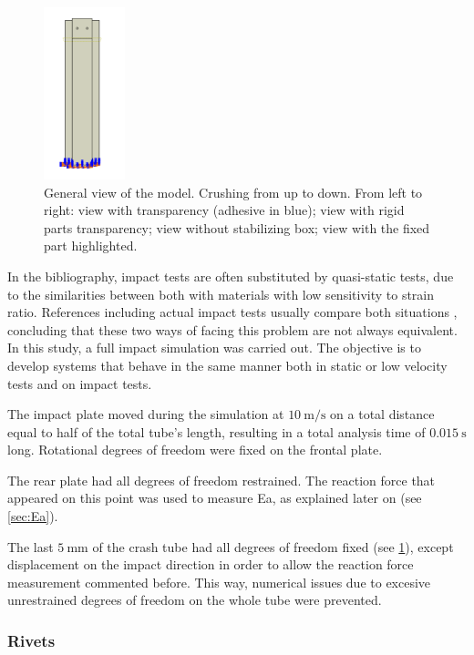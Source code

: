 \documentclass[cmfonts]{witpress}
\begin{document}
\begin{figure}
\begin{minipage}[b]{.22\linewidth}
	\end{minipage}
	\quad
	\begin{minipage}[b]{.22\linewidth}
		\centering
		\includegraphics[height=5cm]{figures/IMG_CUTRES/general_encastre}
	\end{minipage}
	\caption[General view of the model.]{General view of the model. Crushing from up to down. From left to right: view with transparency (adhesive in blue); view with rigid parts transparency; view without stabilizing box; view with the fixed part highlighted.}
	\label{fig:general}
\end{figure}

In the bibliography, impact tests are often substituted by quasi-static tests, due to the similarities between both with materials with low sensitivity to strain ratio. References including actual impact tests usually compare both situations \cite{Goglio2008, Peroni2009}, concluding that these two ways of facing this problem are not always equivalent. In this study, a full impact simulation was carried out. The objective is to develop systems that behave in the same manner both in static or low velocity tests and on impact  tests.

The impact plate moved during the simulation at $\SI{10}{\m/\s}$ on a total distance equal to half of the total tube's length, resulting in a total analysis time of $\SI{0.015}{\s}$ long. Rotational degrees of freedom were fixed on the frontal plate.

The rear plate had all degrees of freedom restrained. The reaction force that appeared on this point was used to measure Ea, as explained later on (see \cref{sec:Ea}).

The last $\SI{5}{\mm}$ of the crash tube had all degrees of freedom fixed (see \cref{fig:general}), except displacement on the impact direction in order to allow the reaction force measurement commented before. This way, numerical issues due to excesive unrestrained degrees of freedom on the whole tube were prevented.

\subsubsection{Rivets}
\end{document}
